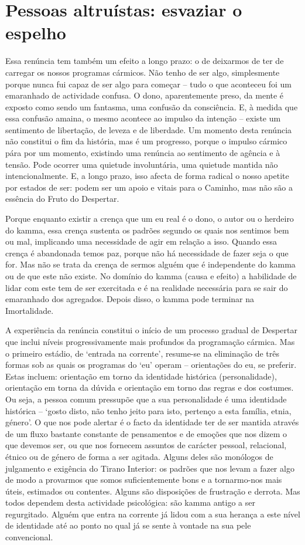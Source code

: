 \section{Pessoas altruístas: esvaziar o espelho}

Essa renúncia tem também um efeito a longo prazo: o de deixarmos de ter de carregar os nossos programas cármicos. Não tenho de ser algo, simplesmente porque nunca fui capaz de ser algo para começar -- tudo o que aconteceu foi um emaranhado de actividade confusa. O dono, aparentemente preso, da mente é exposto como sendo um fantasma, uma confusão da consciência. E, à medida que essa confusão amaina, o mesmo acontece ao impulso da intenção -- existe um sentimento de libertação, de leveza e de liberdade. Um momento desta renúncia não constitui o fim da história, mas é um progresso, porque o impulso cármico pára por um momento, existindo uma renúncia ao sentimento de agência e à tensão. Pode ocorrer uma quietude involuntária, uma quietude mantida não intencionalmente. E, a longo prazo, isso afecta de forma radical o nosso apetite por estados de ser: podem ser um apoio e vitais para o Caminho, mas não são a essência do Fruto do Despertar.

Porque enquanto existir a crença que um eu real é o dono, o autor ou o herdeiro do kamma, essa crença sustenta os padrões segundo os quais nos sentimos bem ou mal, implicando uma necessidade de agir em relação a isso. Quando essa crença é abandonada temos paz, porque não há necessidade de fazer seja o que for. Mas não se trata da crença de sermos alguém que é independente do kamma ou de que este não existe. No domínio do kamma (causa e efeito) a habilidade de lidar com este tem de ser exercitada e é na realidade necessária para se sair do emaranhado dos agregados. Depois disso, o kamma pode terminar na Imortalidade.

A experiência da renúncia constitui o início de um processo gradual de Despertar que inclui níveis progressivamente mais profundos da programação cármica. Mas o primeiro estádio, de `entrada na corrente', resume-se na eliminação de três formas sob as quais os programas do `eu' operam -- orientações do eu, se preferir. Estas incluem: orientação em torno da identidade histórica (personalidade), orientação em torna da dúvida e orientação em torno das regras e dos costumes. Ou seja, a pessoa comum pressupõe que a sua personalidade é uma identidade histórica -- `gosto disto, não tenho jeito para isto, pertenço a esta família, etnia, género'. O que nos pode alertar é o facto da identidade ter de ser mantida através de um fluxo bastante constante de pensamentos e de emoções que nos dizem o que devemos ser, ou que nos fornecem assuntos de carácter pessoal, relacional, étnico ou de género de forma a ser agitada. Alguns deles são monólogos de julgamento e exigência do Tirano Interior: os padrões que nos levam a fazer algo de modo a provarmos que somos suficientemente bons e a tornarmo-nos mais úteis, estimados ou contentes. Alguns são disposições de frustração e derrota. Mas todos dependem desta actividade psicológica: são kamma antigo a ser regurgitado. Alguém que entra na corrente já lidou com a sua herança a este nível de identidade até ao ponto no qual já se sente à vontade na sua pele convencional.

